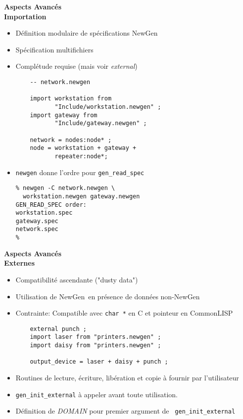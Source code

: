\documentclass[11pt]{article}
\newcommand{\newgen}{NewGen}
\begin{document}
{\begin{center}
{\huge\bf Aspects Avancés \\
Importation}
\end{center}

\vskip 2cm

\begin{itemize}
\item Définition modulaire de spécifications \newgen
\item Spécification multifichiers 
\item Complétude requise (mais voir {\em external})

\begin{verbatim}
    -- network.newgen

    import workstation from 
           "Include/workstation.newgen" ;
    import gateway from 
           "Include/gateway.newgen" ;
 
    network = nodes:node* ;
    node = workstation + gateway + 
           repeater:node*;
\end{verbatim}
\item {\tt newgen} donne l'ordre pour {\tt gen\_read\_spec}

\begin{verbatim}
% newgen -C network.newgen \
  workstation.newgen gateway.newgen
GEN_READ_SPEC order:
workstation.spec
gateway.spec
network.spec
% 
\end{verbatim}
\end{itemize}

\newpage

\begin{center}
{\huge\bf Aspects Avancés \\
Externes}
\end{center}

\vskip 2cm

\begin{itemize}
\item Compatibilité ascendante ("dusty data")
\item Utilisation de \newgen\ en présence de données non-\newgen
\item Contrainte: Compatible avec {\tt char *} en C et pointeur en
CommonLISP 

\begin{verbatim}
    external punch ;
    import laser from "printers.newgen" ;
    import daisy from "printers.newgen" ;

    output_device = laser + daisy + punch ;
\end{verbatim}
\item Routines de lecture, écriture, libération et copie à fournir par
l'utilisateur
\item {\tt gen\_init\_external} à appeler avant toute utilisation.
\item Définition de {\em DOMAIN} pour premier argument de {\tt
gen\_init\_external} 
\end{itemize}

}
\end{document}
